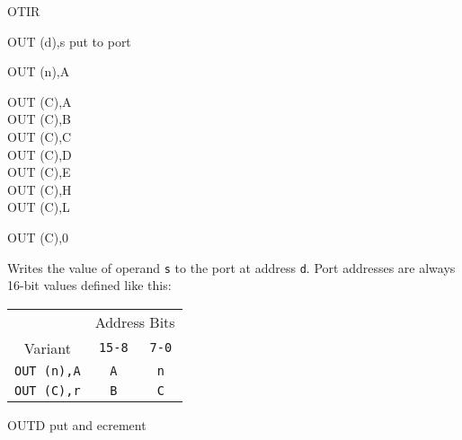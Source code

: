 \begin{basedescript}{
	\desclabelstyle{\multilinelabel}
	\desclabelwidth{3cm}}
\begin{DetailItem}{OTIR}
	\end{DetailItem}

	\pagebreak
	\begin{DetailItem}{OUT (d),s}
		{put to port}
		{}

		\begin{DetailVariants}
			OUT (n),A
			
			\columnbreak
			OUT (C),A\\
			OUT (C),B\\
			OUT (C),C\\
			OUT (C),D\\
			OUT (C),E\\
			OUT (C),H\\
			OUT (C),L

			\columnbreak
			OUT (C),0\UNDOC
		\end{DetailVariants}

		Writes the value of operand {\tt s} to the port at address {\tt d}. Port addresses are always 16-bit values defined like this:

		\begin{tabular}{ccc}
			& \multicolumn{2}{c}{Address Bits} \\
			Variant & {\tt 15-8} & {\tt 7-0} \\
			\hline
			{\tt OUT (n),A} & {\tt A} & {\tt n} \\
			{\tt OUT (C),r} & {\tt B} & {\tt C} \\
		\end{tabular}
		\vspace{1ex} %

		\begin{DetailEffects}
			\FlagsOUTcr
		\end{DetailEffects}
		
		\begin{DetailTiming}
		\end{DetailTiming}


	\end{DetailItem}

	\label{DetailRefOUTD}
	\begin{DetailItem}{OUTD}
		{put and ecrement}
		{\SymOUTD}


\end{DetailItem}
\end{basedescript}
